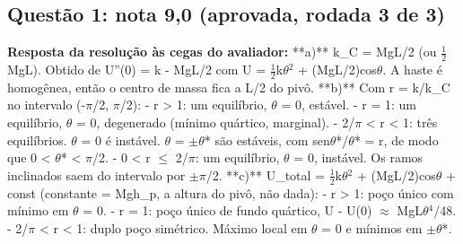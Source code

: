 \documentclass{article}%
\begin{document}
\subsection*{Questão 1: nota 9,0 (aprovada, rodada 3 de 3)}%
\textbf{Resposta da resolução às cegas do avaliador:} **a)** k\_C = MgL/2 (ou $\frac12$MgL). Obtido de U''(0) = k - MgL/2 com U = $\frac12$k$\theta$$^2$ + (MgL/2)cos$\theta$. A haste é homogênea, então o centro de massa fica a L/2 do pivô.\newline%
\newline%
**b)** Com r = k/k\_C no intervalo (-$\pi$/2, $\pi$/2):\newline%
{-} r > 1: um equilíbrio, $\theta$ = 0, estável.\newline%
{-} r = 1: um equilíbrio, $\theta$ = 0, degenerado (mínimo quártico, marginal).\newline%
{-} 2/$\pi$ < r < 1: três equilíbrios. $\theta$ = 0 é instável. $\theta$ = $\pm$$\theta$* são estáveis, com sen$\theta$*/$\theta$* = r, de modo que 0 < $\theta$* < $\pi$/2.\newline%
{-} 0 < r $\leq$ 2/$\pi$: um equilíbrio, $\theta$ = 0, instável. Os ramos inclinados saem do intervalo por $\pm$$\pi$/2.\newline%
\newline%
**c)** U\_total = $\frac12$k$\theta$$^2$ + (MgL/2)cos$\theta$ + const (constante = Mgh\_p, a altura do pivô, não dada):\newline%
{-} r > 1: poço único com mínimo em $\theta$ = 0.\newline%
{-} r = 1: poço único de fundo quártico, U - U(0) $\approx$ MgL$\theta$$^{4}$/48.\newline%
{-} 2/$\pi$ < r < 1: duplo poço simétrico. Máximo local em $\theta$ = 0 e mínimos em $\pm$$\theta$*.\newline%
\end{document}
